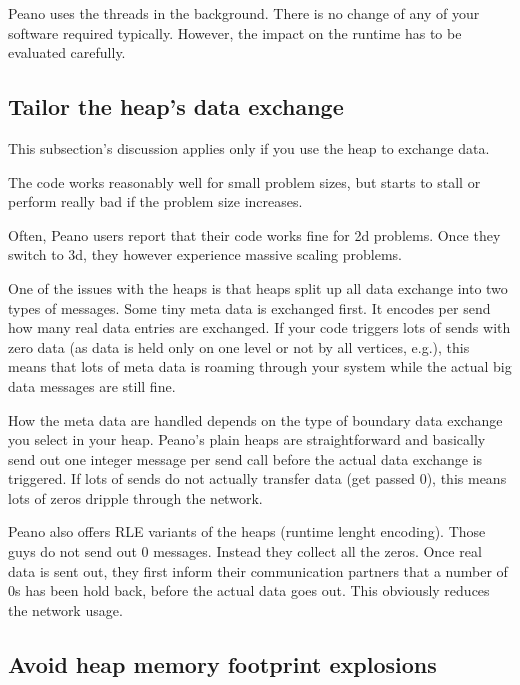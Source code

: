 Peano uses the threads in the background.
There is no change of any of your software required typically.
However, the impact on the runtime has to be evaluated carefully.





\subsection{Tailor the heap's data exchange}

This subsection's discussion applies only if you use the heap to exchange data.

\begin{smell}
  The code works reasonably well for small problem sizes, but starts to stall or
  perform really bad if the problem size increases.
\end{smell}


\noindent
Often, Peano users report that their code works fine for 2d problems. Once they
switch to 3d, they however experience massive scaling problems.

One of the issues with the heaps is that heaps split up all data exchange into
two types of messages. 
Some tiny meta data is exchanged first. 
It encodes per send how many real data entries are exchanged.
If your code triggers lots of sends with zero data (as data is held only on one
level or not by all vertices, e.g.), this means that lots of meta data is
roaming through your system while the actual big data messages are still fine.

How the meta data are handled depends on the type of boundary data exchange you
select in your heap.
Peano's plain heaps are straightforward and basically send out one integer message per 
send call before the actual data exchange is triggered.
If lots of sends do not actually transfer data (get passed 0), this means lots of zeros 
dripple through the network.

Peano also offers RLE variants of the heaps (runtime lenght encoding).
Those guys do not send out 0 messages.
Instead they collect all the zeros. 
Once real data is sent out, they first inform their communication partners that 
a number of 0s has been hold back, before the actual data goes out.
This obviously reduces the network usage.



\subsection{Avoid heap memory footprint explosions}

